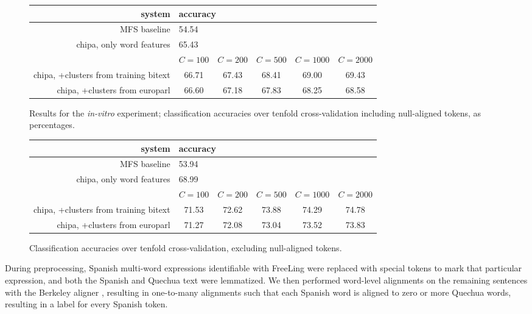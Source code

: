 \begin{figure*}[t!]
  \begin{center}
  \begin{tabular}{|r|c|c|c|c|c|}
    \hline
    system                    & \multicolumn{5}{|l|}{accuracy} \\
    \hline
    MFS baseline              &  \multicolumn{5}{|l|}{54.54} \\
    chipa, only word features &  \multicolumn{5}{|l|}{65.43} \\
    \hline
           & $C=100$ & $C=200$ & $C=500$ & $C=1000$ & $C=2000$ \\
    \hline
    chipa, +clusters from training bitext &
    66.71 & 67.43 & 68.41 & 69.00 & 69.43 \\
    chipa, +clusters from europarl        &
    66.60 & 67.18 & 67.83 & 68.25 & 68.58 \\
    \hline
  \end{tabular}
  \end{center}
\caption{Results for the \emph{in-vitro} experiment; classification accuracies
over tenfold cross-validation including null-aligned tokens, as percentages. }
\label{fig:integrationresults1}
\end{figure*}

\begin{figure*}[t!]
  \begin{center}
  \begin{tabular}{|r|c|c|c|c|c|}
    \hline
    system                    & \multicolumn{5}{|l|}{accuracy} \\
    \hline
    MFS baseline              &  \multicolumn{5}{|l|}{53.94} \\
    chipa, only word features &  \multicolumn{5}{|l|}{68.99} \\
    \hline
           & $C=100$ & $C=200$ & $C=500$ & $C=1000$ & $C=2000$ \\
    \hline
    chipa, +clusters from training bitext &
    71.53 & 72.62 & 73.88 & 74.29 & 74.78 \\
    chipa, +clusters from europarl        &
    71.27 & 72.08 & 73.04 & 73.52 & 73.83 \\
    \hline
  \end{tabular}
  \end{center}
\caption{Classification accuracies over tenfold cross-validation, excluding
null-aligned tokens.}
\label{fig:integrationresults2}
\end{figure*}


During preprocessing, Spanish multi-word expressions identifiable with FreeLing
were replaced with special tokens to mark that particular expression, and both
the Spanish and Quechua text were lemmatized. We then performed word-level
alignments on the remaining sentences with the Berkeley aligner
\cite{denero-klein:2007:ACLMain}, resulting in one-to-many alignments such that
each Spanish word is aligned to zero or more Quechua words, resulting in a
label for every Spanish token.

